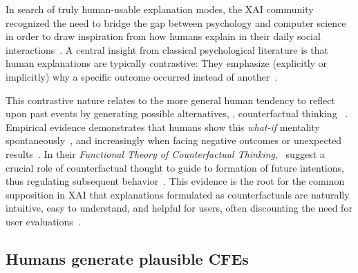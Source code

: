 In search of truly human-usable explanation modes, the \gls{XAI} community recognized the need to bridge the gap between psychology and computer science in order to draw inspiration from how humans explain in their daily social interactions~\citep{miller_explanation_2019}.
A central insight from classical psychological literature is that human explanations are typically contrastive: They emphasize (explicitly or implicitly) why a specific outcome occurred instead of another~\citep{miller_explanation_2019, lipton_contrastive_1990, lombrozo_explanation_2012, hilton_knowledge-based_1986}.

This contrastive nature relates to the more general human tendency to reflect upon past events by generating possible alternatives, \ie, counterfactual thinking ~\citep{roese_counterfactual_1997}.
Empirical evidence demonstrates that humans show this \textit{what-if} mentality spontaneously~\citep{goldinger_blaming_2003}, and increasingly when facing negative outcomes or unexpected results~\citep{sanna_antecedents_1996}.
In their \textit{Functional Theory of Counterfactual Thinking},~\citeauthor{roese_functional_2017} suggest a crucial role of counterfactual thought to guide to formation of future intentions, thus regulating subsequent behavior~\citep{roese_functional_2017,epstude_functional_2008}.
This evidence is the root for the common supposition in \gls{XAI} that explanations formulated as counterfactuals are naturally intuitive, easy to understand, and helpful for users, often discounting the need for user evaluations~\citep{stepin_paving_2019, dandl_multi-objective_2020, guidotti_local_2018, artelt_counterfactual_2020, artelt_efficient_2022}.

\subsection{Humans generate plausible CFEs}\label{subsubsec:psychoCFs_plausible}

